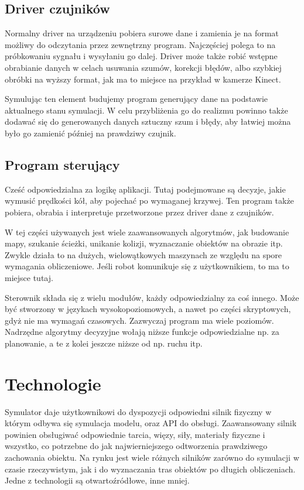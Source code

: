  \subsection{Driver czujników}
 Normalny driver na urządzeniu pobiera surowe dane i zamienia je na format możliwy do odczytania przez zewnętrzny program.
 Najczęściej polega to na próbkowaniu sygnału i wysyłaniu go dalej.
 Driver może także robić wstępne obrabianie danych w celach usuwania szumów, korekcji błędów, albo szybkiej obróbki na wyższy format, jak ma to miejsce na przykład w kamerze Kinect.
 
 Symulując ten element budujemy program generujący dane na podstawie aktualnego stanu symulacji. 
 W celu przybliżenia go do realizmu powinno także dodawać się do generowanych danych sztuczny szum i błędy, aby łatwiej można było go zamienić później na prawdziwy czujnik.
 
\subsection{Program sterujący}
 Cześć odpowiedzialna za logikę aplikacji. Tutaj podejmowane są decyzje, jakie wymusić prędkości kół, aby pojechać po wymaganej krzywej.
 Ten program także pobiera, obrabia i interpretuje przetworzone przez driver dane z czujników.
 
 W tej części używanych jest wiele zaawansowanych algorytmów, jak budowanie mapy, szukanie ścieżki, unikanie kolizji, wyznaczanie obiektów na obrazie itp.
 Zwykle działa to na dużych, wielowątkowych maszynach ze względu na spore wymagania obliczeniowe.
 Jeśli robot komunikuje się z użytkownikiem, to ma to miejsce tutaj.
 
 Sterownik składa się z wielu modułów, każdy odpowiedzialny za coś innego. Może być stworzony w językach wysokopoziomowych, a nawet po części skryptowych, gdyż nie ma wymagań czasowych.
 Zazwyczaj program ma wiele poziomów. Nadrzędne algorytmy decyzyjne wołają niższe funkcje odpowiedzialne np. za planowanie, a te z kolei jeszcze niższe od np. ruchu itp.

\section{Technologie}
Symulator daje użytkownikowi do dyspozycji odpowiedni silnik fizyczny w którym odbywa się symulacja modelu, oraz API do obsługi.
Zaawansowany silnik powinien obsługiwać odpowiednie tarcia, więzy, siły, materiały fizyczne i wszystko, co potrzebne do jak najwierniejszego odtworzenia prawdziwego zachowania obiektu.
Na rynku jest wiele różnych silników zarówno do symulacji w czasie rzeczywistym, jak i do wyznaczania tras obiektów po długich obliczeniach.
Jedne z technologii są otwartoźródłowe, inne mniej.

